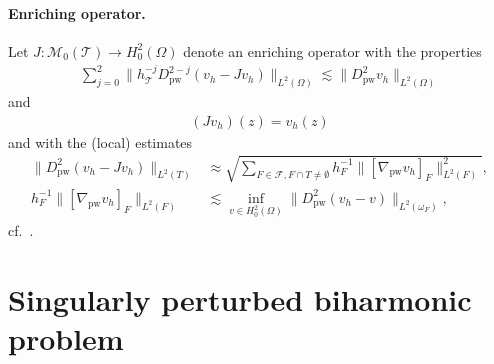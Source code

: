 \documentclass[a4paper]{amsart}
\theoremstyle{definition}
\numberwithin{equation}{section}
\numberwithin{theorem}{section}
\newcommand{\pw}{\mathrm{pw}}
\newcommand{\tri}{\mathcal{T}}
\begin{document}
\paragraph{Enriching operator.}
Let $J:\mathcal{M}_0(\tri)\to H^2_0(\Omega)$ denote an enriching operator 
with the properties \cite{BrennerGudiSung2010}
\begin{align}\label{e:enriching_stab_approx}
    \sum_{j=0}^2 \lVert h_\tri^{-j}D^{2-j}_\pw(v_h-Jv_h)\rVert_{L^2(\Omega)}
   \lesssim \lVert D^2_\pw v_h\rVert_{L^2(\Omega)}
\end{align}
and 
\begin{align}\label{e:prop_enriching_nodal}
    (J v_h) (z) = v_h(z)
\end{align}
and with the (local) estimates  
\begin{equation}\label{e:enriching_apost}
\begin{aligned}
    \lVert D_\pw^2(v_h-Jv_h)\rVert_{L^2(T)}
    &\approx \sqrt{\sum_{F\in\mathcal{F}, F\cap T\neq\emptyset} 
        h_F^{-1} \lVert [\nabla_\pw v_h]_F\rVert_{L^2(F)}^2},\\
    h_F^{-1} \lVert [\nabla_\pw v_h]_F\rVert_{L^2(F)}
    &\lesssim \inf_{v\in H^2_0(\Omega)} \lVert D_\pw^2(v_h-v)\rVert_{L^2(\omega_F)}
    ,
\end{aligned}
\end{equation}
cf.~\cite{BrennerGudiSung2010}.






\section{Singularly perturbed biharmonic problem}
\label{s:sing}
\end{document}
